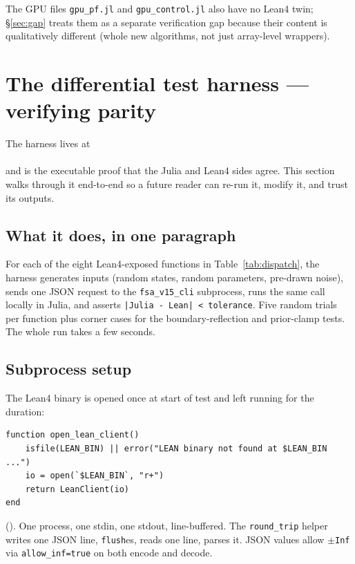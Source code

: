 \documentclass[11pt,a4paper]{article}
\begin{document}
The GPU files \texttt{gpu\_pf.jl} and \texttt{gpu\_control.jl} also
have no Lean4 twin; \S\ref{sec:gap} treats them as a separate verification
gap because their content is qualitatively different (whole new
algorithms, not just array-level wrappers).


\section{The differential test harness --- verifying parity}
\label{sec:diff-test}

The harness lives at\\
\\
and is the executable proof that the Julia and Lean4 sides agree. This
section walks through it end-to-end so a future reader can re-run it,
modify it, and trust its outputs.

\subsection{What it does, in one paragraph}

For each of the eight Lean4-exposed functions in
Table~\ref{tab:dispatch}, the harness generates inputs (random states,
random parameters, pre-drawn noise), sends one JSON request to the
\texttt{fsa\_v15\_cli} subprocess, runs the same call locally in Julia,
and asserts \texttt{|Julia - Lean| < tolerance}. Five random trials per
function plus corner cases for the boundary-reflection and prior-clamp
tests. The whole run takes a few seconds.

\subsection{Subprocess setup}

The Lean4 binary is opened once at start of test and left running for
the duration:

\begin{lstlisting}
function open_lean_client()
    isfile(LEAN_BIN) || error("LEAN binary not found at $LEAN_BIN ...")
    io = open(`$LEAN_BIN`, "r+")
    return LeanClient(io)
end
\end{lstlisting}

\noindent (). One process, one stdin,
one stdout, line-buffered. The \texttt{round\_trip} helper writes one
JSON line, \texttt{flush}es, reads one line, parses it. JSON values
allow \texttt{$\pm$Inf} via \texttt{allow\_inf=true} on both encode and
decode.
\end{document}

